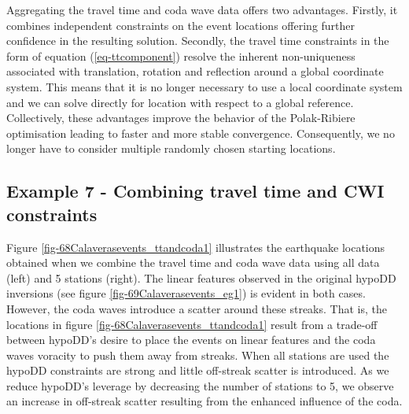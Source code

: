 \documentclass[extra]{gji}
\begin{document}
Aggregating the travel time and coda wave data offers two
advantages. Firstly, it combines independent constraints on the
event locations offering further confidence in the resulting
solution. Secondly, the travel time constraints in the form of
equation (\ref{eq-ttcomponent}) resolve the inherent non-uniqueness
associated with translation, rotation and reflection around a global
coordinate system. This means that it is no longer necessary to use
a local coordinate system and we can solve directly for location
with respect to a global reference. Collectively, these advantages
improve the behavior of the Polak-Ribiere optimisation leading to
faster and more stable convergence. Consequently, we no longer have
to consider multiple randomly chosen starting locations.


\subsection{Example 7 - Combining travel time and CWI constraints}
 Figure
\ref{fig-68Calaverasevents_ttandcoda1} illustrates the earthquake
locations obtained when we combine the travel time and coda wave
data using all data (left) and 5 stations (right). The linear
features observed in the original hypoDD inversions (see figure
\ref{fig-69Calaverasevents_eg1}) is evident in both cases. However,
the coda waves introduce a scatter around these streaks. That is,
the locations in figure \ref{fig-68Calaverasevents_ttandcoda1}
result from a trade-off between hypoDD's desire to place the events
on linear features and the coda waves voracity to push them away
from streaks. When all stations are used the hypoDD constraints are
strong and little off-streak scatter is introduced. As we reduce
hypoDD's leverage by decreasing the number of stations to 5, we
observe an increase in off-streak scatter resulting from the
enhanced influence of the coda.

\end{document}
